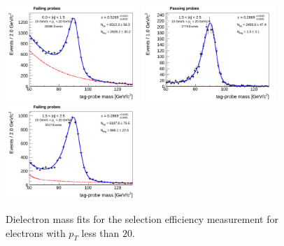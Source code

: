 \begin{figure}[!htbp]
\begin{center}
\includegraphics[width=0.45\textwidth]{figures/ElectronSelectionEffMassFitFail_EtaPtBin2.pdf}
\includegraphics[width=0.45\textwidth]{figures/ElectronSelectionEffMassFitPass_EtaPtBin3.pdf}
\includegraphics[width=0.45\textwidth]{figures/ElectronSelectionEffMassFitFail_EtaPtBin3.pdf}
\caption{Dielectron mass fits for the selection efficiency measurement for electrons with
$p_{T}$ less than $20$\GeV.}
\label{fig:ele_selectionEfficiency_massfits_lowPt}
\end{center}
\end{figure}

